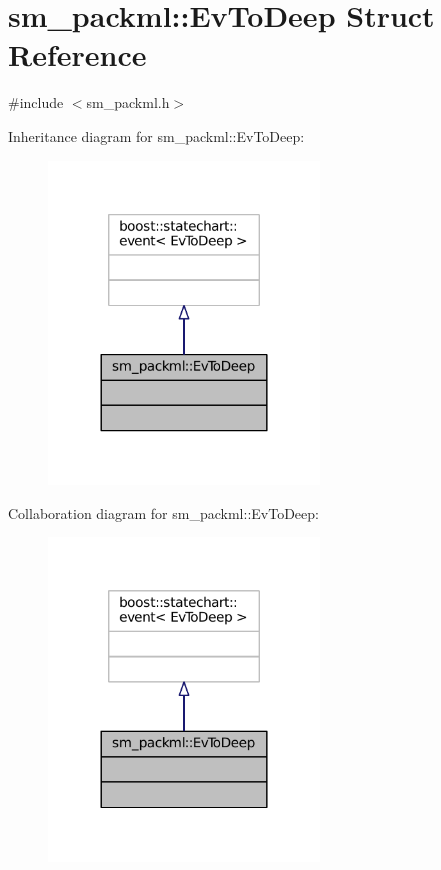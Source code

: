 \hypertarget{structsm__packml_1_1EvToDeep}{}\section{sm\+\_\+packml\+:\+:Ev\+To\+Deep Struct Reference}
\label{structsm__packml_1_1EvToDeep}


{\ttfamily \#include $<$sm\+\_\+packml.\+h$>$}



Inheritance diagram for sm\+\_\+packml\+:\+:Ev\+To\+Deep\+:
\nopagebreak
\begin{figure}[H]
\begin{center}
\leavevmode
\includegraphics[width=204pt]{structsm__packml_1_1EvToDeep__inherit__graph}
\end{center}
\end{figure}


Collaboration diagram for sm\+\_\+packml\+:\+:Ev\+To\+Deep\+:
\nopagebreak
\begin{figure}[H]
\begin{center}
\leavevmode
\includegraphics[width=204pt]{structsm__packml_1_1EvToDeep__coll__graph}
\end{center}
\end{figure}


